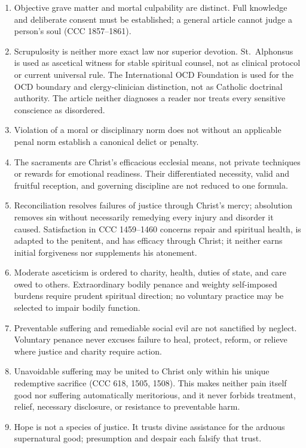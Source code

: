 \begin{enumerate}[leftmargin=1.45em,itemsep=0.25em]
\item Objective grave matter and mortal culpability are distinct. Full knowledge and deliberate consent must be established; a general article cannot judge a person's soul (CCC 1857--1861).
\item Scrupulosity is neither more exact law nor superior devotion. St.~Alphonsus is used as ascetical witness for stable spiritual counsel, not as clinical protocol or current universal rule. The International OCD Foundation is used for the OCD boundary and clergy-clinician distinction, not as Catholic doctrinal authority. The article neither diagnoses a reader nor treats every sensitive conscience as disordered.
\item Violation of a moral or disciplinary norm does not without an applicable penal norm establish a canonical delict or penalty.
\item The sacraments are Christ's efficacious ecclesial means, not private techniques or rewards for emotional readiness. Their differentiated necessity, valid and fruitful reception, and governing discipline are not reduced to one formula.
\item Reconciliation resolves failures of justice through Christ's mercy; absolution removes sin without necessarily remedying every injury and disorder it caused. Satisfaction in CCC 1459--1460 concerns repair and spiritual health, is adapted to the penitent, and has efficacy through Christ; it neither earns initial forgiveness nor supplements his atonement.
\item Moderate asceticism is ordered to charity, health, duties of state, and care owed to others. Extraordinary bodily penance and weighty self-imposed burdens require prudent spiritual direction; no voluntary practice may be selected to impair bodily function.
\item Preventable suffering and remediable social evil are not sanctified by neglect. Voluntary penance never excuses failure to heal, protect, reform, or relieve where justice and charity require action.
\item Unavoidable suffering may be united to Christ only within his unique redemptive sacrifice (CCC 618, 1505, 1508). This makes neither pain itself good nor suffering automatically meritorious, and it never forbids treatment, relief, necessary disclosure, or resistance to preventable harm.
\item Hope is not a species of justice. It trusts divine assistance for the arduous supernatural good; presumption and despair each falsify that trust.

\end{enumerate}
